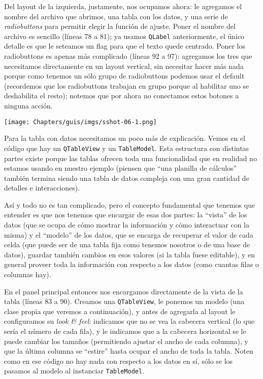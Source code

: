 Del layout de la izquierda, justamente, nos ocupamos ahora: le agregamos el nombre del archivo que abrimos, una tabla con los datos, y una serie de \textit{radiobuttons} para permitir elegir la función de ajuste. Poner el nombre del archivo es sencillo (líneas 78 a 81); ya usamos \texttt{QLabel} anteriormente, el único detalle es que le seteamos un flag para que el texto quede centrado. Poner los radiobuttons es apenas más complicado (líneas 92 a 97): agregamos los tres que necesitamos directamente en un layout vertical, sin necesitar hacer más nada porque como tenemos un sólo grupo de radiobuttons podemos usar el default (recordemos que los radiobuttons trabajan en grupo porque al habilitar uno se deshabilita el resto); notemos que por ahora no conectamos estos botones a ninguna acción.

\begin{center}
    \texttt{[image: Chapters/guis/imgs/sshot-06-1.png]}
\end{center}

Para la tabla con datos necesitamos un poco más de explicación. Vemos en el código que hay un \texttt{QTableView} y un \texttt{TableModel}. Esta estructura con distintas partes existe porque las tablas ofrecen toda una funcionalidad que en realidad no estamos usando en nuestro ejemplo (piensen que ``una planilla de cálculos'' también termina siendo una tabla de datos compleja con una gran cantidad de detalles e interacciones).

Así y todo no es tan complicado, pero el concepto fundamental que tenemos que entender es que nos tenemos que encargar de esas dos partes: la ``vista'' de los datos (que se ocupa de cómo mostrar la información y cómo interactuar con la misma) y el ``modelo'' de los datos, que se encarga de recuperar el valor de cada celda (que puede ser de una tabla fija como tenemos nosotros o de una base de datos), guardar también cambios en esos valores (si la tabla fuese editable), y en general proveer toda la información con respecto a los datos (como cuantas filas o columnas hay).

En el panel principal entonces nos encargamos directamente de la vista de la tabla (líneas 83 a 90). Creamos una \texttt{QTableView}, le ponemos un modelo (una clase propia que veremos a continuación), y antes de agregarla al layout le configuramos su \textit{look \& feel}: indicamos que no se vea la cabecera vertical (lo que sería el número de cada fila), y le indicamos que a la cabecera horizontal se le puede cambiar los tamaños (permitiendo ajustar el ancho de cada columna), y que la última columna se ``estire'' hasta ocupar el ancho de toda la tabla. Noten como en ese código no hay nada con respecto a los datos en sí, sólo se los pasamos al modelo al instanciar \texttt{TableModel}.

